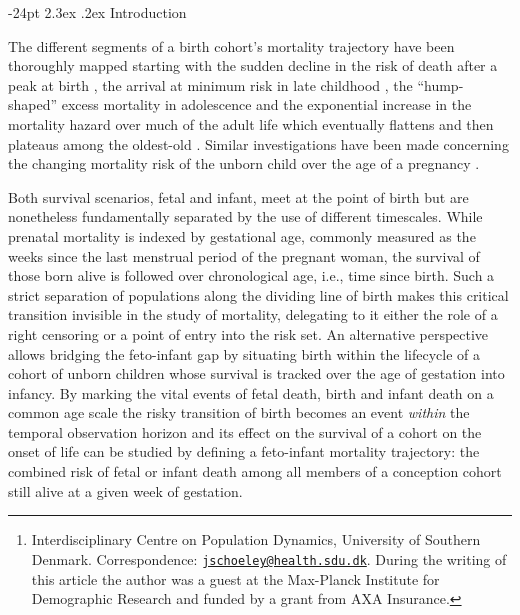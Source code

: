 \documentclass[10pt, twoside]{article}
\title{\large\textbf{The gestational age pattern of feto-infant mortality}\vskip 0em}
\author{\normalsize\textrm{\textbf{Jonas Schöley\footnote{Interdisciplinary Centre on Population Dynamics, University of Southern Denmark. Correspondence: \href{mailto:jschoeley@health.sdu.dk}{\nolinkurl{jschoeley@health.sdu.dk}}. During the writing of this article the author was a guest at the Max-Planck Institute for Demographic Research and funded by a grant from AXA Insurance.}}}}
\date{\vspace{-5ex}}
\makeatletter
\renewcommand\section{\@startsection {section}{1}{\z@}%
                                   {-24pt}%
                                   {2.3ex \@plus.2ex}%
                                   {\normalfont\large\bfseries}}
\makeatother
\begin{document}
  \maketitle

\vspace*{-24pt}
\vspace*{5mm}



\hypertarget{introduction}{%
\section{Introduction}\label{introduction}}

The different segments of a birth cohort's mortality trajectory have been thoroughly mapped starting with the sudden decline in the risk of death after a peak at birth \citep[e.g.,][]{Bourgeois-Pichat1951, Galley1999, Berrut2016}, the arrival at minimum risk in late childhood \citep{Ebeling2018}, the ``hump-shaped'' excess mortality in adolescence \citep[e.g.,][]{Thiele1871, Goldstein2011, Remund2018} and the exponential increase in the mortality hazard over much of the adult life \citep[e.g.,][]{Gompertz1825} which eventually flattens \citep[e.g.,][]{Perks1932, Vaupel1997, Horiuchi1998} and then plateaus among the oldest-old \citep[e.g.,][]{Gampe2010, Barbi2018}. Similar investigations have been made concerning the changing mortality risk of the unborn child over the age of a pregnancy \citep[e.g.,][]{Shapiro1962, Bakketeig1978, Goldhaber1991, Carlson1999, Woods2009}.

Both survival scenarios, fetal and infant, meet at the point of birth but are nonetheless fundamentally separated by the use of different timescales. While prenatal mortality is indexed by gestational age, commonly measured as the weeks since the last menstrual period of the pregnant woman, the survival of those born alive is followed over chronological age, i.e., time since birth. Such a strict separation of populations along the dividing line of birth makes this critical transition invisible in the study of mortality, delegating to it either the role of a right censoring or a point of entry into the risk set. An alternative perspective allows bridging the feto-infant gap by situating birth within the lifecycle of a cohort of unborn children whose survival is tracked over the age of gestation into infancy. By marking the vital events of fetal death, birth and infant death on a common age scale the risky transition of birth becomes an event \emph{within} the temporal observation horizon and its effect on the survival of a cohort on the onset of life can be studied by defining a feto-infant mortality trajectory: the combined risk of fetal or infant death among all members of a conception cohort still alive at a given week of gestation.
\end{document}
